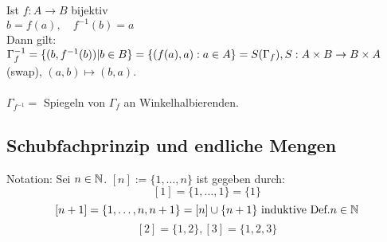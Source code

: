\documentclass[../ana1.tex]{subfiles}
\begin{document}
\begin{bsp}
	Ist \(f: A\rightarrow B\) bijektiv\\
	\(b=f(a),\quad f^{-1}(b)=a\) \\
	Dann gilt: \(\Gamma_f^{-1} = \{(b, f^{-1}(b)) | b\in B\} \\
	= \{(f(a),a):a\in A\} = S(\Gamma_f), S: A\times B \rightarrow B\times A\) (swap), \( (a,b)\mapsto(b,a) \).\\
	 \quad
	\\
	\(\Gamma_{f^{-1}} = \) Spiegeln von \( \Gamma_f \) an Winkelhalbierenden.
\end{bsp}


\subsection{Schubfachprinzip und endliche Mengen}

Notation: Sei \( n\in\mathbb{N} \). \([n] := \{1,\ldots,n\} \) ist gegeben durch:
\[ [1] = \{1,\ldots,1\} = \{1\} \]
\[ [n+1] = \{1,\ldots,n,n+1\} = [n] \cup \{n+1\}\text{ induktive Def.} n\in\mathbb{N} \]
\[ [2]=\{1,2\}, [3]=\{1,2,3\} \]
\end{document}
